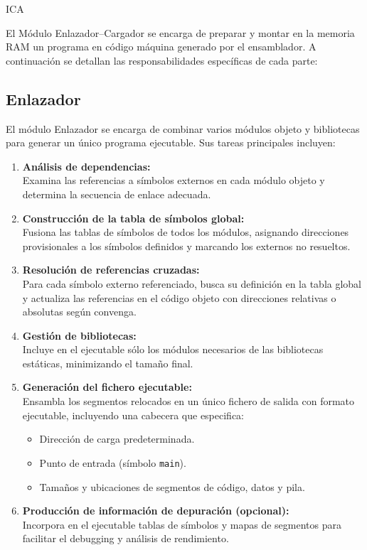 ICA\documentclass{article}
\begin{document}
El Módulo Enlazador–Cargador se encarga de preparar y montar en la memoria RAM un programa en código máquina generado por el ensamblador. A continuación se detallan las responsabilidades específicas de cada parte:
\subsection{Enlazador}

El módulo Enlazador se encarga de combinar varios módulos objeto y bibliotecas para generar un único programa ejecutable. Sus tareas principales incluyen:

\begin{enumerate}
\item \textbf{Análisis de dependencias:}\\
Examina las referencias a símbolos externos en cada módulo objeto y determina la secuencia de enlace adecuada.

\item \textbf{Construcción de la tabla de símbolos global:}\\
Fusiona las tablas de símbolos de todos los módulos, asignando direcciones provisionales a los símbolos definidos y marcando los externos no resueltos.

\item \textbf{Resolución de referencias cruzadas:}\\
Para cada símbolo externo referenciado, busca su definición en la tabla global y actualiza las referencias en el código objeto con direcciones relativas o absolutas según convenga.

\item \textbf{Gestión de bibliotecas:}\\
Incluye en el ejecutable sólo los módulos necesarios de las bibliotecas estáticas, minimizando el tamaño final.

\item \textbf{Generación del fichero ejecutable:}\\
Ensambla los segmentos relocados en un único fichero de salida con formato ejecutable, incluyendo una cabecera que especifica:
\begin{itemize}
\item Dirección de carga predeterminada.
\item Punto de entrada (símbolo \texttt{main}).
\item Tamaños y ubicaciones de segmentos de código, datos y pila.
\end{itemize}

\item \textbf{Producción de información de depuración (opcional):}\\
Incorpora en el ejecutable tablas de símbolos y mapas de segmentos para facilitar el debugging y análisis de rendimiento.
\end{enumerate}
\end{document}
